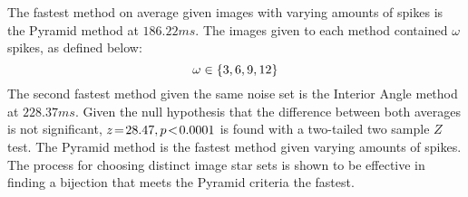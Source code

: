 %
%
%
%
The fastest method on average given images with varying amounts of spikes is the Pyramid method at $186.22\si{ms}$.
The images given to each method contained $\omega$ spikes, as defined below:
\begin{equation}\label{eq:numberOfSpikes}
    \omega \in \set{ 3, 6, 9, 12 }
\end{equation}
The second fastest method given the same noise set is the Interior Angle method at $228.37\si{ms}$.
Given the null hypothesis that the difference between both averages is not significant, $z \!=\! 28.47, p\!<\!0.0001$ is
found with a two-tailed two sample $Z$ test.
The Pyramid method is the fastest method given varying amounts of spikes.
The process for choosing distinct image star sets is shown to be effective in finding a bijection that meets the Pyramid
criteria the fastest.

